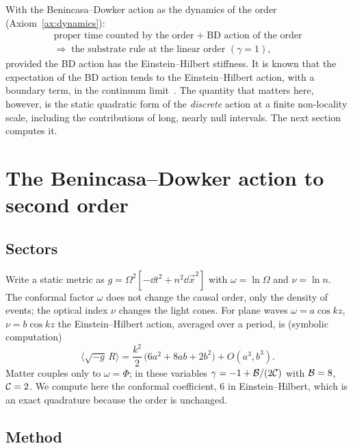 With the Benincasa--Dowker action as the dynamics of the order (Axiom~\ref{ax:dynamics}):
\begin{equation*}
  \begin{gathered}
  \text{proper time counted by the order} \;+\; \text{BD action of the order}\\
  \Longrightarrow\;\text{the substrate rule at the linear order } (\gamma=1),
  \end{gathered}
\end{equation*}
provided the BD action has the Einstein--Hilbert stiffness. It is known that the expectation of the BD
action tends to the Einstein--Hilbert action, with a boundary term, in the continuum
limit~\cite{BenincasaDowker2010,MachetWang2020}.
The quantity that matters here, however, is the static quadratic form of the \emph{discrete} action at a
finite non-locality scale, including the contributions of long, nearly null intervals. The next section
computes it.

\section{The Benincasa--Dowker action to second order}\label{sec:bdaction}

\subsection{Sectors}

Write a static metric as $g=\Omega^2[-\dd t^2+n^2\dd\vec x^2]$ with $\omega=\ln\Omega$ and $\nu=\ln n$. The
conformal factor $\omega$ does not change the causal order, only the density of events; the optical
index $\nu$ changes the light cones. For plane waves $\omega=a\cos kz$, $\nu=b\cos kz$ the
Einstein--Hilbert action, averaged over a period, is (symbolic computation)
\begin{equation}\label{eq:EHquad}
  \Big\langle\sqrt{-g}\,R\Big\rangle=\frac{k^2}{2}\,\big(6a^2+8ab+2b^2\big)+O(a^3,b^3).
\end{equation}
Matter couples only to $\omega=\Phi$; in these variables $\gamma=-1+\mathcal{B}/(2\mathcal{C})$ with $\mathcal{B}=8$, $\mathcal{C}=2$. We compute
here the conformal coefficient, $6$ in Einstein--Hilbert, which is an exact quadrature because the order
is unchanged.

\subsection{Method}

